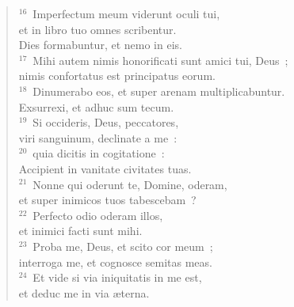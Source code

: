 \begin{verse}
${}^{16}$~Imperfectum meum viderunt oculi tui,\\ et in libro tuo omnes scribentur.\\ Dies formabuntur, et nemo in eis.\\
${}^{17}$~Mihi autem nimis honorificati sunt amici tui, Deus~;\\ nimis confortatus est principatus eorum.\\
${}^{18}$~Dinumerabo eos, et super arenam multiplicabuntur.\\ Exsurrexi, et adhuc sum tecum.\\
${}^{19}$~Si occideris, Deus, peccatores,\\ viri sanguinum, declinate a me~:\\
${}^{20}$~quia dicitis in cogitatione~:\\ Accipient in vanitate civitates tuas.\\
${}^{21}$~Nonne qui oderunt te, Domine, oderam,\\ et super inimicos tuos tabescebam~?\\
${}^{22}$~Perfecto odio oderam illos,\\ et inimici facti sunt mihi.\\
${}^{23}$~Proba me, Deus, et scito cor meum~;\\ interroga me, et cognosce semitas meas.\\
${}^{24}$~Et vide si via iniquitatis in me est,\\ et deduc me in via \ae terna.\end{verse}



